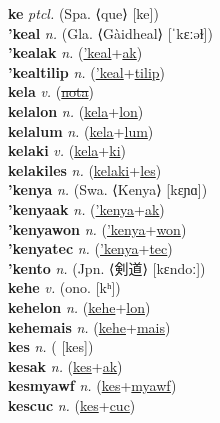 \textbf{ke} \textit{ptcl.} (Spa. ⟨que⟩ [ke])
 \label{ke} \\
\textbf{'keal} \textit{n.} (Gla. ⟨Gàidheal⟩ [ˈkɛːəɫ])
 \label{'keal} \\
\textbf{'kealak} \textit{n.} (\hyperref['keal]{'keal}+\hyperref[ak]{ak})
 \label{'kealak} \\
\textbf{'kealtilip} \textit{n.} (\hyperref['keal]{'keal}+\hyperref[tilip]{tilip})
 \label{'kealtilip} \\
\textbf{kela} \textit{v.} (\hyperref[nota]{\sout{nota}})
 \label{kela} \\
\textbf{kelalon} \textit{n.} (\hyperref[kela]{kela}+\hyperref[lon]{lon})
 \label{kelalon} \\
\textbf{kelalum} \textit{n.} (\hyperref[kela]{kela}+\hyperref[lum]{lum})
 \label{kelalum} \\
\textbf{kelaki} \textit{v.} (\hyperref[kela]{kela}+\hyperref[ki]{ki})
 \label{kelaki} \\
\textbf{kelakiles} \textit{n.} (\hyperref[kelaki]{kelaki}+\hyperref[les]{les})
 \label{kelakiles} \\
\textbf{'kenya} \textit{n.} (Swa. ⟨Kenya⟩ [kɛɲɑ])
 \label{'kenya} \\
\textbf{'kenyaak} \textit{n.} (\hyperref['kenya]{'kenya}+\hyperref[ak]{ak})
 \label{'kenyaak} \\
\textbf{'kenyawon} \textit{n.} (\hyperref['kenya]{'kenya}+\hyperref[won]{won})
 \label{'kenyawon} \\
\textbf{'kenyatec} \textit{n.} (\hyperref['kenya]{'kenya}+\hyperref[tec]{tec})
 \label{'kenyatec} \\
\textbf{'kento} \textit{n.} (Jpn. ⟨剣道⟩ [kɛndoː])
 \label{'kento} \\
\textbf{kehe} \textit{v.} (ono. [kʰ])
 \label{kehe} \\
\textbf{kehelon} \textit{n.} (\hyperref[kehe]{kehe}+\hyperref[lon]{lon})
 \label{kehelon} \\
\textbf{kehemais} \textit{n.} (\hyperref[kehe]{kehe}+\hyperref[mais]{mais})
 \label{kehemais} \\
\textbf{kes} \textit{n.} ( [kes])
 \label{kes} \\
\textbf{kesak} \textit{n.} (\hyperref[kes]{kes}+\hyperref[ak]{ak})
 \label{kesak} \\
\textbf{kesmyawf} \textit{n.} (\hyperref[kes]{kes}+\hyperref[myawf]{myawf})
 \label{kesmyawf} \\
\textbf{kescuc} \textit{n.} (\hyperref[kes]{kes}+\hyperref[cuc]{cuc})
 \label{kescuc} \\
